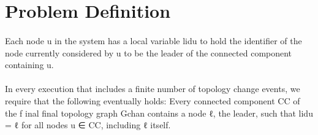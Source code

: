 \section{Problem Definition}
\paragraph{}Each node u in the system has a local variable lidu to hold the identifier of the node currently considered by u to be the leader of the connected component containing u.
\paragraph{}In every execution that includes a finite number of topology change events, we require that the following eventually holds: Every connected component CC of the f inal final topology graph Gchan contains a node ℓ, the leader, such that lidu = ℓ for all nodes u ∈ CC, including ℓ itself.